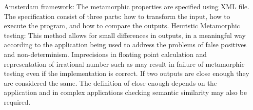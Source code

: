 		Amsterdam framework: The metamorphic properties are specified using XML file. The specification consist of three parts: how to transform the input, how to execute the program, and how to compare the outputs.
		Heuristic Metamorphic testing: This method allows for small differences in outputs, in a meaningful way according to the application being used to address the problems of false positives and non-determinism. Imprecisions in floating point calculation and representation of irrational number such as may result in failure of metamorphic testing even if the implementation is correct. If two outputs are close enough they are considered the same. The definition of close enough depends on the application and in complex applications checking semantic similarity may also be required.
